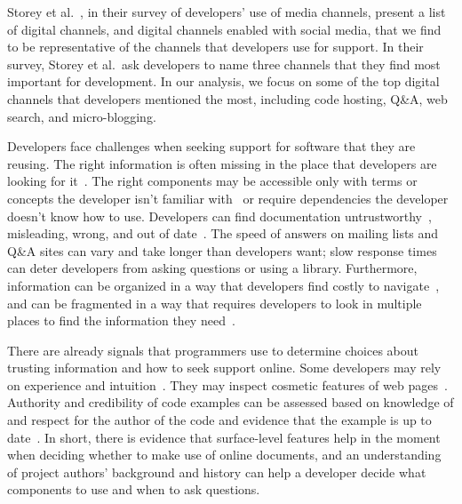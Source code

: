 Storey et al.~\cite{storey_revolution_2014}, in their survey of developers' use of media channels, present a list of digital channels, and digital channels enabled with social media, that we find to be representative of the channels that developers use for support.
In their survey, Storey et al.\ ask developers to name three channels that they find most important for development.
In our analysis, we focus on some of the top digital channels that developers mentioned the most, including code hosting, Q\&A, web search, and micro-blogging.


Developers face challenges when seeking support for software that they are reusing.
The right information is often missing in the place that developers are looking for it~\cite{robillard_field_2011,storey_revolution_2014,nykaza_what_2002}.
The right components may be accessible only with terms or concepts the developer isn't familiar with~\cite{nykaza_what_2002,jeong_improving_2009,robillard_field_2011} or require dependencies the developer doesn't know how to use.
Developers can find documentation untrustworthy~\cite{robillard_field_2011,storey_revolution_2014}, misleading, wrong, and out of date~\cite{nykaza_what_2002,lethbridge_how_2003,robillard_field_2011}.
The speed of answers on mailing lists and Q\&A sites can vary and take longer than developers want; slow response times can deter developers from asking questions or using a library.
Furthermore, information can be organized in a way that developers find costly to navigate~\cite{robillard_field_2011}, and can be fragmented in a way that requires developers to look in multiple places to find the information they need~\cite{jeong_improving_2009}.

There are already signals that programmers use to determine choices about trusting information and how to seek support online.
Some developers may rely on experience and intuition~\cite{storey_revolution_2014}.
They may inspect cosmetic features of web pages~\cite{brandt_two_2009}.
Authority and credibility of code examples can be assessed based on knowledge of and respect for the author of the code and evidence that the example is up to date~\cite{robillard_field_2011}.
In short, there is evidence that surface-level features help in the moment when deciding whether to make use of online documents, and an understanding of project authors' background and history can help a developer decide what components to use and when to ask questions.

